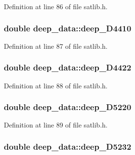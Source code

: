 Definition at line 86 of file satlib.\-h.

\hypertarget{structdeep__data_a6777c25b08e398a519efa14ccc328b18}{
\subsubsection[{deep\-\_\-\-D4410}]{\setlength{\rightskip}{0pt plus 5cm}double deep\-\_\-data\-::deep\-\_\-\-D4410}}\label{structdeep__data_a6777c25b08e398a519efa14ccc328b18}


Definition at line 87 of file satlib.\-h.

\hypertarget{structdeep__data_a9ac99ac71a7e9d41e18e0b8d23881b27}{
\subsubsection[{deep\-\_\-\-D4422}]{\setlength{\rightskip}{0pt plus 5cm}double deep\-\_\-data\-::deep\-\_\-\-D4422}}\label{structdeep__data_a9ac99ac71a7e9d41e18e0b8d23881b27}


Definition at line 88 of file satlib.\-h.

\hypertarget{structdeep__data_a070522e386b048a06c43a704492b63cd}{
\subsubsection[{deep\-\_\-\-D5220}]{\setlength{\rightskip}{0pt plus 5cm}double deep\-\_\-data\-::deep\-\_\-\-D5220}}\label{structdeep__data_a070522e386b048a06c43a704492b63cd}


Definition at line 89 of file satlib.\-h.

\hypertarget{structdeep__data_af6cb901bd696af94de75b2d78800db43}{
\subsubsection[{deep\-\_\-\-D5232}]{\setlength{\rightskip}{0pt plus 5cm}double deep\-\_\-data\-::deep\-\_\-\-D5232}}\label{structdeep__data_af6cb901bd696af94de75b2d78800db43}


